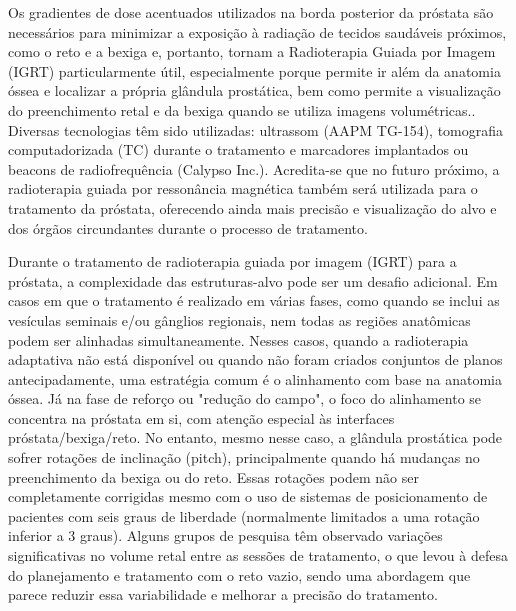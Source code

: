 \documentclass[11pt,a4paper]{article}
\begin{document}
	Os gradientes de dose acentuados utilizados na borda posterior da próstata são necessários para minimizar a exposição à radiação de tecidos saudáveis próximos, como o reto e a bexiga e, portanto, tornam a Radioterapia Guiada por Imagem (IGRT) particularmente útil, especialmente porque permite ir além da anatomia óssea e localizar a própria glândula prostática, bem como permite a visualização do preenchimento retal e da bexiga quando se utiliza imagens volumétricas.. Diversas tecnologias têm sido utilizadas: ultrassom (AAPM TG-154), tomografia computadorizada (TC) durante o tratamento e marcadores implantados ou beacons de radiofrequência (Calypso Inc.). Acredita-se que no futuro próximo, a radioterapia guiada por ressonância magnética também será utilizada para o tratamento da próstata, oferecendo ainda mais precisão e visualização do alvo e dos órgãos circundantes durante o processo de tratamento.

	Durante o tratamento de radioterapia guiada por imagem (IGRT) para a próstata, a complexidade das estruturas-alvo pode ser um desafio adicional. Em casos em que o tratamento é realizado em várias fases, como quando se inclui as vesículas seminais e/ou gânglios regionais, nem todas as regiões anatômicas podem ser alinhadas simultaneamente. Nesses casos, quando a radioterapia adaptativa não está disponível ou quando não foram criados conjuntos de planos antecipadamente, uma estratégia comum é o alinhamento com base na anatomia óssea. Já na fase de reforço ou "redução do campo", o foco do alinhamento se concentra na próstata em si, com atenção especial às interfaces próstata/bexiga/reto. No entanto, mesmo nesse caso, a glândula prostática pode sofrer rotações de inclinação (pitch), principalmente quando há mudanças no preenchimento da bexiga ou do reto. Essas rotações podem não ser completamente corrigidas mesmo com o uso de sistemas de posicionamento de pacientes com seis graus de liberdade (normalmente limitados a uma rotação inferior a 3 graus). Alguns grupos de pesquisa têm observado variações significativas no volume retal entre as sessões de tratamento, o que levou à defesa do planejamento e tratamento com o reto vazio, sendo uma abordagem que parece reduzir essa variabilidade e melhorar a precisão do tratamento.
\end{document}
